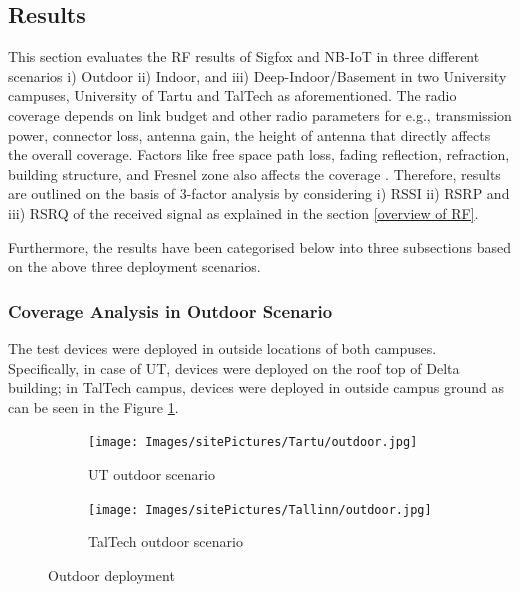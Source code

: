\documentclass[12pt]{article}
\begin{document}
\subsection{Results}\label{results}
This section evaluates the RF results of Sigfox and NB-IoT in three different scenarios i) Outdoor ii) Indoor, and iii) Deep-Indoor/Basement in two University campuses, University of Tartu and TalTech as aforementioned. The radio coverage depends on link budget and other radio parameters for e.g., transmission power, connector loss, antenna gain, the height of antenna that directly affects the overall coverage. Factors like free space path loss, fading reflection, refraction, building structure, and Fresnel zone also affects the coverage \cite{sikora2019test,sikora2019performance}. Therefore, results are outlined on the basis of 3-factor analysis by considering i) RSSI ii) RSRP and iii) RSRQ of the received signal as explained in the section \ref{overview of RF}.\par

Furthermore, the results have been categorised below into three subsections based on the above three deployment scenarios.

\subsubsection{Coverage Analysis in Outdoor Scenario}\label{Outdoor Analysis}

The test devices were deployed in outside locations of both campuses. Specifically, in case of UT, devices were deployed on the roof top of Delta building; in TalTech campus, devices were deployed in outside campus ground as can be seen in the Figure \ref{fig:Outdoor deployment}.\par



\begin{figure}[H]
\centering
\begin{subfigure}[t]{0.42\linewidth}
  \centering
   \texttt{[image: Images/sitePictures/Tartu/outdoor.jpg]} 
  \caption{UT outdoor scenario}
\end{subfigure}
\begin{subfigure}[t]{0.42\linewidth}
  \centering
  \texttt{[image: Images/sitePictures/Tallinn/outdoor.jpg]} 
  \caption{TalTech outdoor scenario}
\end{subfigure}

\caption{Outdoor deployment}
 \label{fig:Outdoor deployment}
\end{figure}
\end{document}
